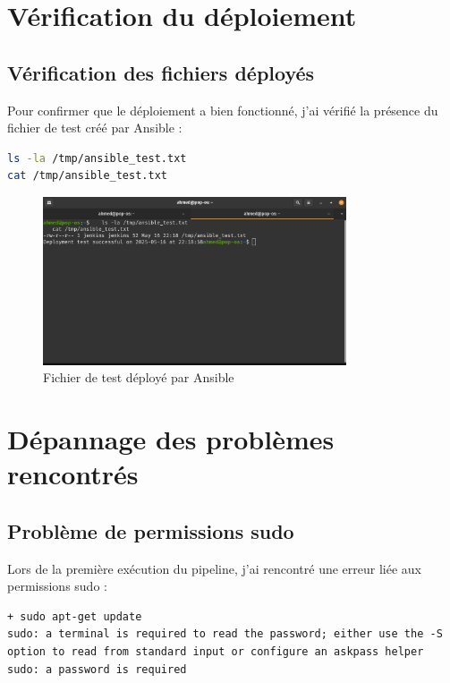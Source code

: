 \documentclass{article}
\begin{document}
\section{Vérification du déploiement}
\subsection{Vérification des fichiers déployés}

Pour confirmer que le déploiement a bien fonctionné, j'ai vérifié la présence du fichier de test créé par Ansible :

\begin{lstlisting}[language=bash]
ls -la /tmp/ansible_test.txt
cat /tmp/ansible_test.txt
\end{lstlisting}

\begin{figure}[h]
    \centering
    \includegraphics[width=0.8\textwidth]{images/deployed_files.png}
    \caption{Fichier de test déployé par Ansible}
    \label{fig:deployed_files}
\end{figure}

\section{Dépannage des problèmes rencontrés}
\subsection{Problème de permissions sudo}

Lors de la première exécution du pipeline, j'ai rencontré une erreur liée aux permissions sudo :

\begin{lstlisting}
+ sudo apt-get update
sudo: a terminal is required to read the password; either use the -S option to read from standard input or configure an askpass helper
sudo: a password is required
\end{lstlisting}
\end{document}
